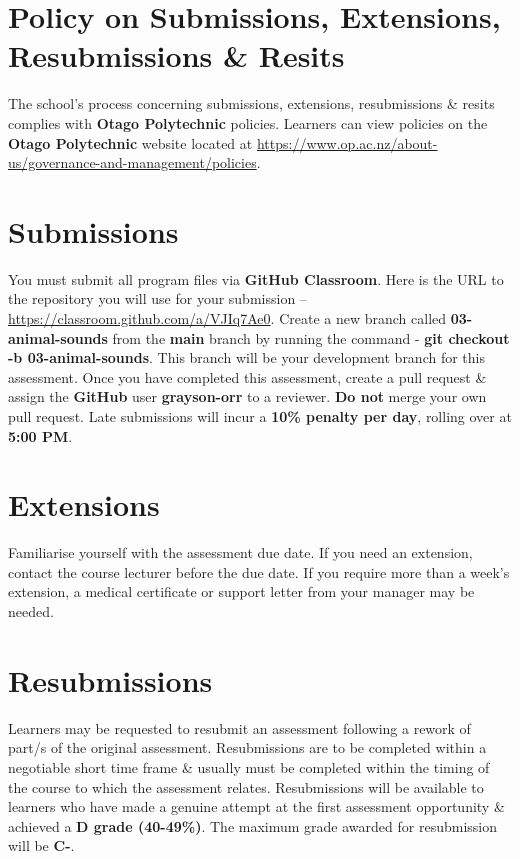 \documentclass{article}
\begin{document}
\section*{Policy on Submissions, Extensions, Resubmissions \& Resits}
The school's process concerning submissions, extensions, resubmissions \& resits complies with \textbf{Otago Polytechnic} policies. Learners can view policies on the \textbf{Otago Polytechnic} website located at \href{https://www.op.ac.nz/about-us/governance-and-management/policies}{https://www.op.ac.nz/about-us/governance-and-management/policies}.

\section*{Submissions}
You must submit all program files via \textbf{GitHub Classroom}. Here is the URL to the repository you will use for your submission – \href{https://classroom.github.com/a/VJIq7Ae0}{https://classroom.github.com/a/VJIq7Ae0}. Create a new branch called  \textbf{03-animal-sounds} from the \textbf{main} branch by running the command - \textbf{git checkout -b 03-animal-sounds}. This branch will be your development branch for this assessment. Once you have completed this assessment, create a pull request \& assign the \textbf{GitHub} user \textbf{grayson-orr} to a reviewer. \textbf{Do not} merge your own pull request. Late submissions will incur a \textbf{10\% penalty per day}, rolling over at \textbf{5:00 PM}.

\section*{Extensions}
Familiarise yourself with the assessment due date. If you need an extension, contact the course lecturer before the due date. If you require more than a week's extension, a medical certificate or support letter from your manager may be needed.

\section*{Resubmissions}
Learners may be requested to resubmit an assessment following a rework of part/s of the original assessment. Resubmissions are to be completed within a negotiable short time frame \& usually must be completed within the timing of the course to which the assessment relates. Resubmissions will be available to learners who have made a genuine attempt at the first assessment opportunity \& achieved a \textbf{D grade (40-49\%)}. The maximum grade awarded for resubmission will be \textbf{C-}.
\end{document}
